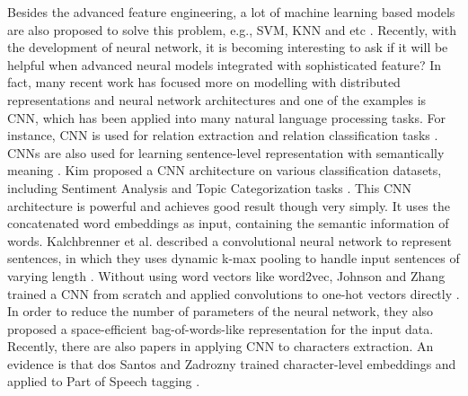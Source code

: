 \documentclass[conference]{IEEEtran}
\begin{document}
Besides the advanced feature engineering, a lot of machine learning based models are also proposed to solve this problem, e.g., SVM, KNN and etc \cite{DBLP:conf/fintal/KozarevaM06}. Recently, with the development of neural network, it is becoming interesting to ask if it will be helpful when advanced neural models integrated with sophisticated feature? In fact, many recent work has focused more on modelling with distributed representations and neural network architectures and one of the examples is CNN, which has been applied into many natural language processing tasks. For instance, CNN is used for relation extraction and relation classification tasks \cite{nguyen2015relation}. CNNs are also used for learning sentence-level representation with semantically meaning \cite{DBLP:conf/cikm/ShenHGDM14}. Kim proposed a CNN architecture on various classification datasets, including Sentiment Analysis and Topic Categorization tasks \cite{DBLP:conf/emnlp/Kim14}. This CNN architecture is powerful and achieves good result though very simply. It uses the concatenated word embeddings as input, containing the semantic information of words. Kalchbrenner et al. described a convolutional neural network to represent sentences, in which they uses dynamic k-max pooling to handle input sentences of varying length \cite{DBLP:conf/acl/KalchbrennerGB14}. Without using word vectors like word2vec, Johnson and Zhang trained a CNN from scratch and applied convolutions to one-hot vectors directly \cite{DBLP:conf/nips/JohnsonZ15}. In order to reduce the number of parameters of the neural network, they also proposed a space-efficient bag-of-words-like representation for the input data. Recently, there are also papers in applying CNN to characters extraction. An evidence is that dos Santos and Zadrozny trained character-level embeddings and applied to Part of Speech tagging \cite{DBLP:conf/icml/SantosZ14}.
\end{document}
